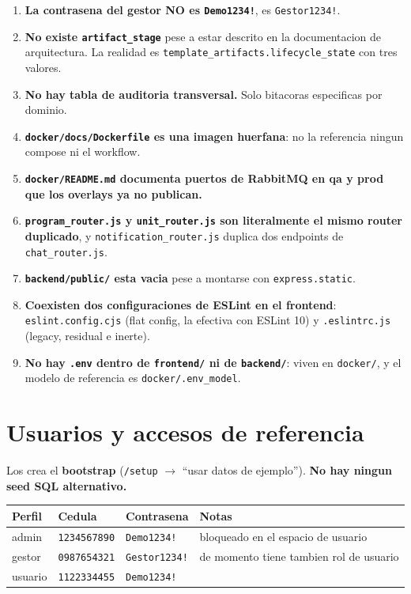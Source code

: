 \documentclass[11pt,a4paper,oneside]{report}
\newcommand{\rt}[1]{\texttt{#1}}
\begin{document}
\begin{enumerate}[leftmargin=1.8em,itemsep=6pt]
  \item \textbf{La contrasena del gestor NO es \rt{Demo1234!}}, es \rt{Gestor1234!}.

  \item \textbf{No existe \rt{artifact\_stage}} pese a estar descrito en la documentacion de
        arquitectura. La realidad es \rt{template\_artifacts.lifecycle\_state} con tres valores.

  \item \textbf{No hay tabla de auditoria transversal.} Solo bitacoras especificas por dominio.

  \item \textbf{\rt{docker/docs/Dockerfile} es una imagen huerfana}: no la referencia ningun
        compose ni el workflow.

  \item \textbf{\rt{docker/README.md} documenta puertos de RabbitMQ en qa y prod que los
        overlays ya no publican.}

  \item \textbf{\rt{program\_router.js} y \rt{unit\_router.js} son literalmente el mismo router
        duplicado}, y \rt{notification\_router.js} duplica dos endpoints de \rt{chat\_router.js}.

  \item \textbf{\rt{backend/public/} esta vacia} pese a montarse con \rt{express.static}.

  \item \textbf{Coexisten dos configuraciones de ESLint en el frontend}:
        \rt{eslint.config.cjs} (flat config, la efectiva con ESLint 10) y \rt{.eslintrc.js}
        (legacy, residual e inerte).

  \item \textbf{No hay \rt{.env} dentro de \rt{frontend/} ni de \rt{backend/}}: viven en
        \rt{docker/}, y el modelo de referencia es \rt{docker/.env\_model}.
\end{enumerate}

\section{Usuarios y accesos de referencia}

Los crea el \textbf{bootstrap} (\rt{/setup} $\rightarrow$ ``usar datos de ejemplo''). \textbf{No
hay ningun seed SQL alternativo.}

\begin{center}
\footnotesize
\begin{tabularx}{\textwidth}{@{}P{2.4cm}P{3.4cm}P{3.0cm}L@{}}
\toprule
\textbf{Perfil} & \textbf{Cedula} & \textbf{Contrasena} & \textbf{Notas} \\
\midrule
admin   & \rt{1234567890} & \rt{Demo1234!}   & bloqueado en el espacio de usuario \\
gestor  & \rt{0987654321} & \rt{Gestor1234!} & de momento tiene tambien rol de usuario \\
usuario & \rt{1122334455} & \rt{Demo1234!}   & \\
\bottomrule
\end{tabularx}
\end{center}
\end{document}

